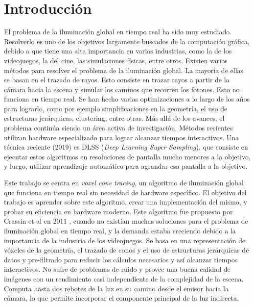 \chapter{Introducción}


El problema de la iluminación global en tiempo real ha sido muy estudiado.
Resolverlo es uno de los objetivos largamente buscados de la computación gráfica, debido a que tiene una alta importancia en varias industrias, como la de los videojuegos, la del cine, las simulaciones físicas, entre otros.
Existen varios métodos para resolver el problema de la iluminación global.
La mayoría de ellas se basan en el trazado de rayos.
Esto consiste en trazar rayos a partir de la cámara hacia la escena y simular los caminos que recorren los fotones.
Esto no funciona en tiempo real.
Se han hecho varias optimizaciones a lo largo de los años para lograrlo, como por ejemplo simplificaciones en la geometría, el uso de estructuras jerárquicas, clustering, entre otras.
Más allá de los avances, el problema continúa siendo un área activa de investigación.
Métodos recientes utilizan hardware especializado para lograr alcanzar tiempos interactivos.
Una técnica reciente (2019) es DLSS (\textit{Deep Learning Super Sampling}), que consiste en ejecutar estos algoritmos en resoluciones de pantalla mucho menores a la objetivo, y luego, utilizar aprendizaje automático para agrandar esa pantalla a la objetivo.

Este trabajo se centra en \textit{voxel cone tracing}, un algoritmo de iluminación global que funciona en tiempo real sin necesidad de hardware específico.
El objetivo del trabajo es aprender sobre este algoritmo, crear una implementación del mismo, y probar su eficiencia en hardware moderno.
Este algoritmo fue propuesto por Crassin et al en 2011 \cite{voxel-cone-tracing}, cuando no existían muchas soluciones para el problema de iluminación global en tiempo real, y la demanda estaba creciendo debido a la importancia de la industria de los videojuegos.
Se basa en una representación de vóxeles de la geometría, el trazado de conos y el uso de estructuras jerárquicas de datos y pre-filtrado para reducir los cálculos necesarios y así alcanzar tiempos interactivos.
No sufre de problemas de ruido y provee una buena calidad de imágenes con un rendimiento casi independiente de la complejidad de la escena.
Computa hasta dos rebotes de la luz en su camino desde el emisor hacia la cámara, lo que permite incorporar el componente principal de la luz indirecta.

